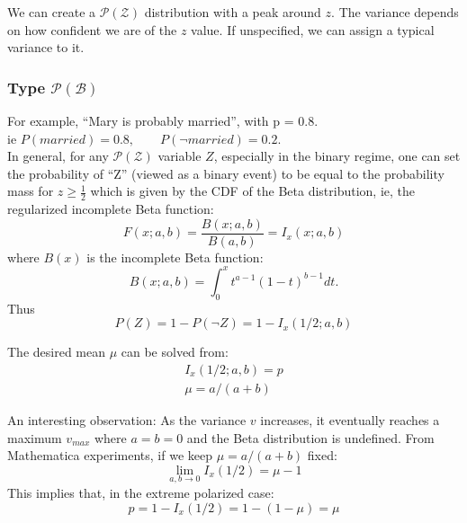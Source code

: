 We can create a $\mathcal{P(Z)}$ distribution with a peak around $z$.  The variance depends on how confident we are of the $z$ value.  If unspecified, we can assign a typical variance to it.

\subsubsection{Type $\mathcal{P(B)}$}

For example, ``Mary is probably married'', with p = 0.8.\\
ie \hspace*{1cm} $P(married) = 0.8, \quad \quad P(\neg married) = 0.2$.\\

In general, for any $\mathcal{P(Z)}$ variable $Z$, especially in the binary regime, one can set the probability of ``Z'' (viewed as a binary event) to be equal to the probability mass for $z \geq \frac{1}{2}$ which is given by the CDF of the Beta distribution, ie, the regularized incomplete Beta function:
$$ F(x; a, b) = \frac{ B(x; a, b) }{ B(a, b) } = I_x(x; a, b) $$
where $B(x)$ is the incomplete Beta function:
$$ B(x; a, b) = \int^x_0 t^{a-1} (1-t)^{b-1} dt \mbox{.}$$
Thus
$$ P(Z) = 1 - P(\neg Z) = 1 - I_x(1/2; a, b) $$

The desired mean $\mu$ can be solved from:
\begin{eqnarray}
I_x(1/2; a, b) = p\\
\mu = a/(a+b)
\label{eqn:mean-and-p}
\end{eqnarray}

An interesting observation:  As the variance $v$ increases, it eventually reaches a maximum $v_{max}$ where $a=b=0$ and the Beta distribution is undefined.  From Mathematica experiments, if we keep $ \mu = a / (a+b) $  fixed:\\
$$ \lim_{a,b \rightarrow 0} I_x(1/2) = \mu - 1 $$
This implies that, in the extreme polarized case:\\
$$ p = 1 - I_x(1/2) = 1 - (1 - \mu) = \mu $$

%

